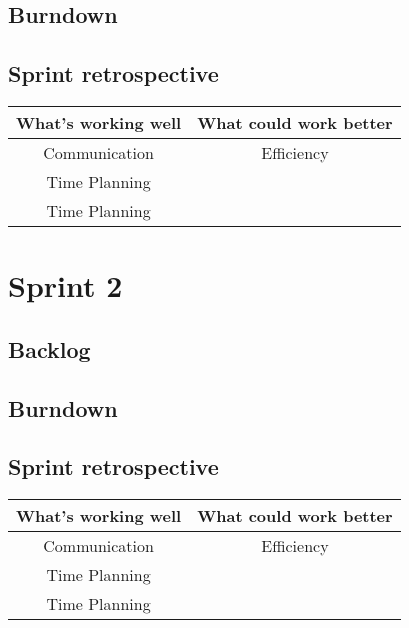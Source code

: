 \documentclass[]{report}
\begin{document}
\section{Burndown}


\section{Sprint retrospective}

\begin{center}
\begin{tabular}{|c|c|}
\hline \textbf{What's working well} & \textbf{What could work better} \\ 
\hline Communication & Efficiency \\ 
 Time Planning &  \\ 
 Time Planning &  \\ 
\hline 
\end{tabular} 
\end{center}



\newpage
\chapter{Sprint 2}
\label{chap:Spring 2}

\section{Backlog}


\section{Burndown}


\section{Sprint retrospective}

\begin{center}
\begin{tabular}{|c|c|}
\hline \textbf{What's working well} & \textbf{What could work better} \\ 
\hline Communication & Efficiency \\ 
 Time Planning &  \\ 
 Time Planning &  \\ 
\hline 
\end{tabular} 
\end{center}
\end{document}
